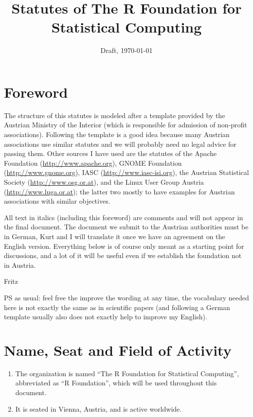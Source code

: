 \documentclass[a4paper]{article}
\title{\bf Statutes of The R Foundation for Statistical Computing}
\date{Draft, \today}
\newcommand{\RF}{``R Foundation''}
\begin{document}
\maketitle

\it

\section*{Foreword}

The structure of this statutes is modeled after a template provided by
the Austrian Ministry of the Interior (which is responsible for
admission of non-profit associations). Following the template is a
good idea because many Austrian associations use similar statutes and we
will probably need no legal advice for passing them. Other sources I
have used are the statutes of
the Apache Foundation (\url{http://www.apache.org}),
GNOME Foundation (\url{http://www.gnome.org}),
IASC (\url{http://www.iasc-isi.org}),
the Austrian Statistical Society (\url{http://www.osg.or.at}),
and the Linux User Group Austria (\url{http://www.luga.or.at});
the latter two mostly to have examples
for Austrian associations with similar objectives.

All text in italics (including this foreword) are comments and will
not appear in the final document. The document we submit to the
Austrian authorities must be in German, Kurt and I will translate it
once we have an agreement on the English version. Everything below is
of course only meant as a starting point for discussions, and a lot of
it will be useful even if we establish the foundation not in Austria.

\medskip\noindent
Fritz

\medskip\noindent
PS as usual: feel free the improve the wording at any time, the
vocabulary needed here is not exactly the same as in scientific
papers (and following a German template usually also does not exactly
help to improve my English).

\rm

\section{Name, Seat and Field of Activity}

\begin{enumerate}
 \item The organization is named ``The R Foundation for Statistical
  Computing'', abbreviated as \RF{}, which will be used
  throughout this document.
 \item It is seated in Vienna, Austria, and is active worldwide.
\end{enumerate}
\end{document}
